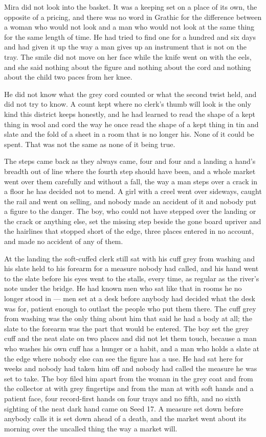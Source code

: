 Mira did not look into the basket. It was a keeping set on a place of its own, the opposite of a pricing, and there was no word in Grathic for the difference between a woman who would not look and a man who would not look at the same thing for the same length of time. He had tried to find one for a hundred and six days and had given it up the way a man gives up an instrument that is not on the tray. The smile did not move on her face while the knife went on with the eels, and she said nothing about the figure and nothing about the cord and nothing about the child two paces from her knee.

He did not know what the grey cord counted or what the second twist held, and did not try to know. A count kept where no clerk's thumb will look is the only kind this district keeps honestly, and he had learned to read the shape of a kept thing in wool and cord the way he once read the shape of a kept thing in tin and slate and the fold of a sheet in a room that is no longer his. None of it could be spent. That was not the same as none of it being true.

\scenebreak

The steps came back as they always came, four and four and a landing a hand's breadth out of line where the fourth step should have been, and a whole market went over them carefully and without a fall, the way a man steps over a crack in a floor he has decided not to mend. A girl with a creel went over sideways, caught the rail and went on selling, and nobody made an accident of it and nobody put a figure to the danger. The boy, who could not have stepped over the landing or the crack or anything else, set the missing step beside the gone board upriver and the hairlines that stopped short of the edge, three places entered in no account, and made no accident of any of them.

At the landing the soft-cuffed clerk still sat with his cuff grey from washing and his slate held to his forearm for a measure nobody had called, and his hand went to the slate before his eyes went to the stalls, every time, as regular as the river's note under the bridge. He had known men who sat like that in rooms he no longer stood in --- men set at a desk before anybody had decided what the desk was for, patient enough to outlast the people who put them there. The cuff grey from washing was the only thing about him that said he had a body at all; the slate to the forearm was the part that would be entered. The boy set the grey cuff and the neat slate on two places and did not let them touch, because a man who washes his own cuff has a hunger or a habit, and a man who holds a slate at the edge where nobody else can see the figure has a use. He had sat here for weeks and nobody had taken him off and nobody had called the measure he was set to take. The boy filed him apart from the woman in the grey coat and from the collector at  with grey fingertips and from the man at  with soft hands and a patient face, four record-first hands on four trays and no fifth, and no sixth sighting of the neat dark hand came on Seed 17. A measure set down before anybody calls it is set down ahead of a death, and the market went about its morning over the uncalled thing the way a market will.

